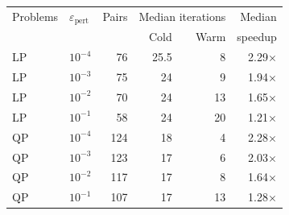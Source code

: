 \begin{tabular}{llrrrr}
\hline
Problems & $\varepsilon_{\mathrm{pert}}$ & Pairs & \multicolumn{2}{c}{Median iterations} & Median \\
 & & & Cold & Warm & speedup \\
\hline
LP & $10^{-4}$ & 76 & 25.5 & 8 & 2.29$\times$ \\
LP & $10^{-3}$ & 75 & 24 & 9 & 1.94$\times$ \\
LP & $10^{-2}$ & 70 & 24 & 13 & 1.65$\times$ \\
LP & $10^{-1}$ & 58 & 24 & 20 & 1.21$\times$ \\
QP & $10^{-4}$ & 124 & 18 & 4 & 2.28$\times$ \\
QP & $10^{-3}$ & 123 & 17 & 6 & 2.03$\times$ \\
QP & $10^{-2}$ & 117 & 17 & 8 & 1.64$\times$ \\
QP & $10^{-1}$ & 107 & 17 & 13 & 1.28$\times$ \\
\hline
\end{tabular}
